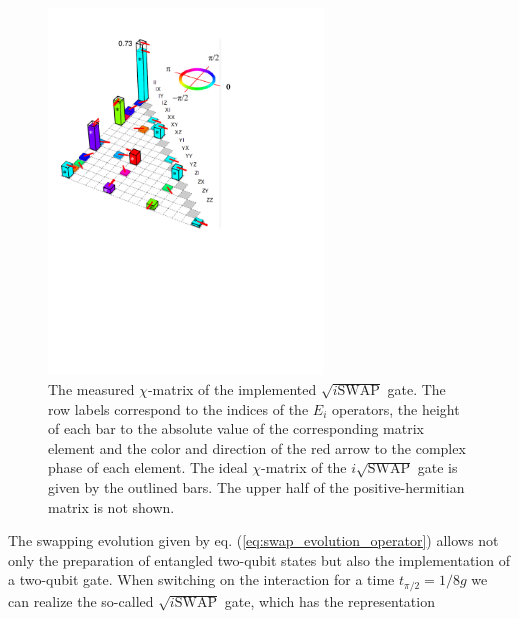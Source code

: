 \begin{figure}
		\includegraphics[width=0.65\textwidth]{./material/papers/iswap/figures/chi_matrix}
	\caption[Measured $\chi$-matrix of the $\sqrt{i\textrm{SWAP}}$ gate]{The measured $\chi$-matrix of the implemented $\sqrt{i\mathrm{SWAP}}$ gate. The row labels correspond to the indices of the $E_i$ operators, the height of each bar to the absolute value of the corresponding matrix element and the color and direction of the red arrow to the complex phase of each element. The ideal $\chi$-matrix of the $i\sqrt{\mathrm{SWAP}}$ gate is given by the outlined bars. The upper half of the positive-hermitian matrix is not shown.}
	\label{fig:gate_chi_matrix_and_errors}
\end{figure}

The swapping evolution given by eq. (\ref{eq:swap_evolution_operator}) allows not only the preparation of entangled two-qubit states but also the implementation of a two-qubit gate. When switching on the interaction for a time $t_{\pi/2} = 1/8g$ we can realize the so-called $\sqrt{i\mathrm{SWAP}}$ gate, which has the representation

